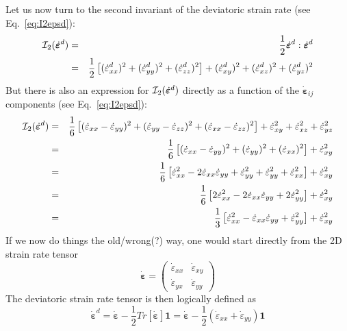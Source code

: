 Let us now turn to the second invariant of the deviatoric strain rate 
(see Eq.~\eqref{eq:I2epsd}):
\begin{eqnarray}
{\cal I}_2(\dot{\bm{\varepsilon}}^d)
&=& \frac{1}{2} \dot{\bm{\varepsilon}}^d:\dot{\bm{\varepsilon}}^d \\
&=& \frac{1}{2} \left[ (\dot{\varepsilon}_{xx}^d)^2 + (\dot{\varepsilon}_{yy}^d)^2 + (\dot{\varepsilon}_{zz}^d)^2   \right] 
+ (\dot{\varepsilon}_{xy}^d)^2  
+ (\dot{\varepsilon}_{xz}^d)^2  
+ (\dot{\varepsilon}_{yz}^d)^2  
\end{eqnarray}
But there is also an expression for ${\cal I}_2(\dot{\bm{\varepsilon}}^d)$ directly as a function of the $\dot{\bm\varepsilon}_{ij}$ components 
(see Eq.~\eqref{eq:I2epsd}):
\begin{eqnarray}
{\cal I}_2(\dot{\bm{\varepsilon}}^d)
&=& \frac{1}{6} \left[ (\dot{\varepsilon}_{xx}-\dot{\varepsilon}_{yy})^2 
+ (\dot{\varepsilon}_{yy}-\dot{\varepsilon}_{zz})^2 
+ (\dot{\varepsilon}_{xx}-\dot{\varepsilon}_{zz})^2 \right] 
+ \dot{\varepsilon}_{xy}^2 + \dot{\varepsilon}_{xz}^2 + \dot{\varepsilon}_{yz}^2 \\
&=& 
\frac{1}{6} \left[ (\dot{\varepsilon}_{xx}-\dot{\varepsilon}_{yy})^2 
+ (\dot{\varepsilon}_{yy})^2 
+ (\dot{\varepsilon}_{xx})^2 \right] 
+ \dot{\varepsilon}_{xy}^2 \\
&=& \frac{1}{6} \left[ \dot{\varepsilon}_{xx}^2 
-2\dot{\varepsilon}_{xx}\dot{\varepsilon}_{yy}
+\dot{\varepsilon}_{yy}^2 
+ \dot{\varepsilon}_{yy}^2 
+ \dot{\varepsilon}_{xx}^2 \right] 
+ \dot{\varepsilon}_{xy}^2 \\
&=& \frac{1}{6} \left[ 
2\dot{\varepsilon}_{xx}^2 
-2\dot{\varepsilon}_{xx}\dot{\varepsilon}_{yy}
+2\dot{\varepsilon}_{yy}^2 
\right] 
+ \dot{\varepsilon}_{xy}^2 \\
&=& 
\frac{1}{3} \left[ 
\dot{\varepsilon}_{xx}^2 
-\dot{\varepsilon}_{xx}\dot{\varepsilon}_{yy}
+\dot{\varepsilon}_{yy}^2 
\right] 
+ \dot{\varepsilon}_{xy}^2 
\end{eqnarray}
If we now do things the old/wrong(?) way, one would start directly from the 2D strain rate tensor 
\[
\dot{\bm \varepsilon} = 
\left(
\begin{array}{cc}
\dot{\varepsilon}_{xx} & \dot{\varepsilon}_{xy}  \\
\dot{\varepsilon}_{yx} & \dot{\varepsilon}_{yy}  
\end{array}
\right)
\]
The deviatoric strain rate tensor is then logically defined as 
\[
\dot{\bm \varepsilon}^d 
= \dot{\bm \varepsilon} -\frac{1}{2} Tr[\dot{\bm \varepsilon}]   {\bm 1} 
= \dot{\bm \varepsilon} -\frac{1}{2} (\dot{\varepsilon}_{xx} +\dot{\varepsilon}_{yy}   )  {\bm 1} 
\]

